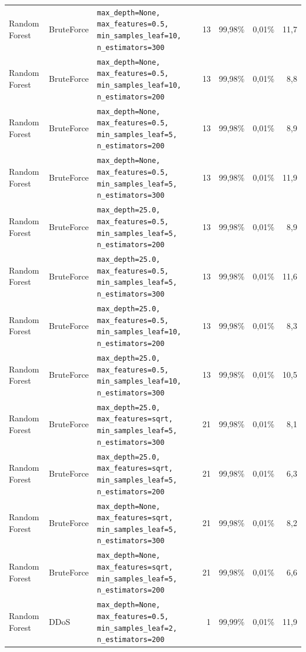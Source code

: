 {{\begin{tabularx}{\textwidth}{@{}llLrrrr@{}}
Random Forest & BruteForce & \scriptsize\texttt{max\_depth=None, max\_features=0.5, min\_samples\_leaf=10, n\_estimators=300} & 13 & 99,98\% & 0,01\% & 11,7\\
Random Forest & BruteForce & \scriptsize\texttt{max\_depth=None, max\_features=0.5, min\_samples\_leaf=10, n\_estimators=200} & 13 & 99,98\% & 0,01\% & 8,8\\
Random Forest & BruteForce & \scriptsize\texttt{max\_depth=None, max\_features=0.5, min\_samples\_leaf=5, n\_estimators=200} & 13 & 99,98\% & 0,01\% & 8,9\\
Random Forest & BruteForce & \scriptsize\texttt{max\_depth=None, max\_features=0.5, min\_samples\_leaf=5, n\_estimators=300} & 13 & 99,98\% & 0,01\% & 11,9\\
Random Forest & BruteForce & \scriptsize\texttt{max\_depth=25.0, max\_features=0.5, min\_samples\_leaf=5, n\_estimators=200} & 13 & 99,98\% & 0,01\% & 8,9\\
Random Forest & BruteForce & \scriptsize\texttt{max\_depth=25.0, max\_features=0.5, min\_samples\_leaf=5, n\_estimators=300} & 13 & 99,98\% & 0,01\% & 11,6\\
Random Forest & BruteForce & \scriptsize\texttt{max\_depth=25.0, max\_features=0.5, min\_samples\_leaf=10, n\_estimators=200} & 13 & 99,98\% & 0,01\% & 8,3\\
Random Forest & BruteForce & \scriptsize\texttt{max\_depth=25.0, max\_features=0.5, min\_samples\_leaf=10, n\_estimators=300} & 13 & 99,98\% & 0,01\% & 10,5\\
Random Forest & BruteForce & \scriptsize\texttt{max\_depth=25.0, max\_features=sqrt, min\_samples\_leaf=5, n\_estimators=300} & 21 & 99,98\% & 0,01\% & 8,1\\
Random Forest & BruteForce & \scriptsize\texttt{max\_depth=25.0, max\_features=sqrt, min\_samples\_leaf=5, n\_estimators=200} & 21 & 99,98\% & 0,01\% & 6,3\\
Random Forest & BruteForce & \scriptsize\texttt{max\_depth=None, max\_features=sqrt, min\_samples\_leaf=5, n\_estimators=300} & 21 & 99,98\% & 0,01\% & 8,2\\
Random Forest & BruteForce & \scriptsize\texttt{max\_depth=None, max\_features=sqrt, min\_samples\_leaf=5, n\_estimators=200} & 21 & 99,98\% & 0,01\% & 6,6\\
Random Forest & DDoS & \scriptsize\texttt{max\_depth=None, max\_features=0.5, min\_samples\_leaf=2, n\_estimators=200} & 1 & 99,99\% & 0,01\% & 11,9\\

\end{tabularx}}}
